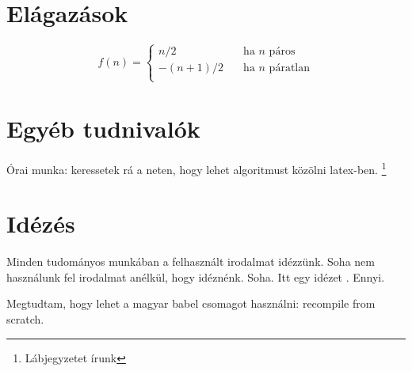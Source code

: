 \section{Elágazások}

 \begin{equation}	
 f(n) =
  \begin{cases}
    n/2       & \quad \text{ha } n \text{ páros}\\
    -(n+1)/2  & \quad \text{ha } n \text{ páratlan}\\
  \end{cases}
  \end{equation}
  
\section{Egyéb tudnivalók} 

	Órai munka: keressetek rá a neten, hogy lehet algoritmust
    közölni latex-ben.
	\footnote{Lábjegyzetet írunk}
    

\section{Idézés}

	Minden tudományos munkában a felhasznált irodalmat idézzünk.
    Soha nem használunk fel irodalmat anélkül, hogy idéznénk.
    Soha.
    Itt egy idézet \cite{nika2016strong}. Ennyi.
    
    Megtudtam, hogy lehet a magyar babel csomagot használni:
    recompile from scratch.
    
    

